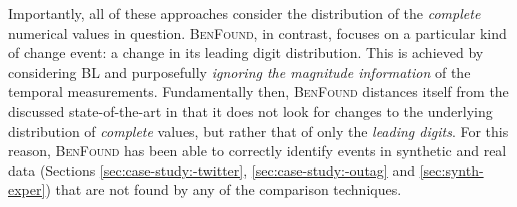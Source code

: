 \documentclass[twoside,leqno,twocolumn]{article}\usepackage[]{graphicx}\usepackage[]{color}
\newcommand{\algoname}{\textsc{BenFound}}
\newcommand{\TED}{\textsc{TED}}
\begin{document}



Importantly, all of these approaches consider the distribution of the \textit{complete} numerical values in question. \algoname{}, in contrast, focuses on a particular kind of change event: a change in its leading digit distribution. This is achieved by considering BL and purposefully \textit{ignoring the magnitude information} of the temporal measurements. Fundamentally then, \algoname{} distances itself from the discussed state-of-the-art in that it does not look for changes to the underlying distribution of \textit{complete} values, but rather that of only the \textit{leading digits}. For this reason, \algoname{} has been able to correctly identify events in synthetic and real data (Sections \ref{sec:case-study:-twitter}, \ref{sec:case-study:-outag} and \ref{sec:synth-exper}) that are not found by any of the comparison techniques.


\end{document}
